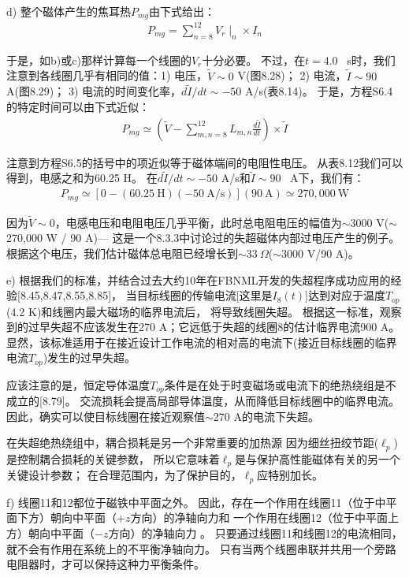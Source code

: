 d) 整个磁体产生的焦耳热$P_{mg}$由下式给出：
\begin{align*}%
P_{mg}=\sum_{n=8}^{12}V_r\mid_n\times I_n \tag{S6.4}
\end{align*}

于是，如b)或c)那样计算每一个线圈的$V_r$十分必要。
不过，在$t=4.0$~ s时，我们注意到各线圈几乎有相同的值：1) 电压，$\tilde{V}\sim 0$ V(图8.28)；
2) 电流，$\tilde{I}\sim 90$ A(图8.29)；
3) 电流的时间变化率，$d\tilde{I}/dt\sim -50$ A/s(表8.14)。
于是，方程S6.4的特定时间可以由下式近似：
\begin{align*}%
P_{mg}\simeq\left(\tilde{V}-\sum_{m,n=8}^{12}L_{m,n}\frac{d\tilde{I}}{dt}\right)\times \tilde{I} \tag{S6.5}
\end{align*}

注意到方程S6.5的括号中的项近似等于磁体端间的电阻性电压。
从表8.12我们可以得到，电感之和为60.25 H。
在$d\tilde{I}/dt\sim -50$ A/s和$\tilde{I}\sim 90$~ A下，我们有：
\begin{align*}%
P_{mg}\simeq[0-(60.25\ \mathrm{H})(-50\ \mathrm{A/s})](90\ \mathrm{A})\simeq 270,000\ \mathrm{W} \tag{S6.6}
\end{align*}

因为$\tilde{V}\sim 0$，电感电压和电阻电压几乎平衡，此时总电阻电压的幅值为$\sim$3000 V($\sim$270,000 W / 90 A)---
这是一个8.3.3中讨论过的失超磁体内部过电压产生的例子。
根据这个电压，我们估计磁体总电阻已经增长到$\sim 33\ \Omega$($\sim$3000 V/90 A)。

e) 根据我们的标准，并结合过去大约10年在FBNML开发的失超程序成功应用的经验[8.45,8.47,8.55,8.85]，
当目标线圈的传输电流[这里是$I_8(t)$]达到对应于温度$T_{op}$(4.2 K)和线圈内最大磁场的临界电流后，
将导致线圈失超。
根据这一标准，观察到的过早失超不应该发生在270 A；它远低于失超的线圈8的估计临界电流900 A。
显然，该标准适用于在接近设计工作电流的相对高的电流下(接近目标线圈的临界电流$T_{op}$)发生的过早失超。

应该注意的是，恒定导体温度$T_{op}$条件是在处于时变磁场或电流下的绝热绕组是不成立的[8.79]。
交流损耗会提高局部导体温度，从而降低目标线圈中的临界电流。
因此，确实可以使目标线圈在接近观察值$\sim$270 A的电流下失超。

在失超绝热绕组中，耦合损耗是另一个非常重要的加热源
因为细丝扭绞节距($\ell_p$)是控制耦合损耗的关键参数，
所以它意味着$\ell_p$是与保护高性能磁体有关的另一个关键设计参数；
在合理范围内，为了保护目的，$\ell_p$应特别加长。

f) 线圈11和12都位于磁铁中平面之外。
因此，存在一个作用在线圈11（位于中平面下方）朝向中平面（$+z$方向）的净轴向力和
一个作用在线圈12（位于中平面上方）朝向中平面（$-z$方向）的净轴向力 。
只要通过线圈11和线圈12的电流相同，就不会有作用在系统上的不平衡净轴向力。
只有当两个线圈串联并共用一个旁路电阻器时，才可以保持这种力平衡条件。

